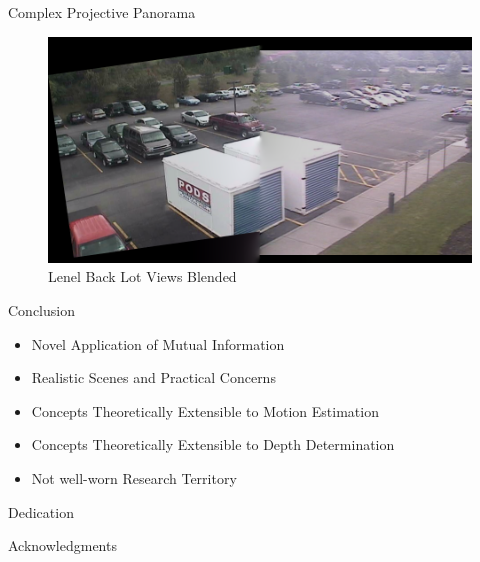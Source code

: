 \documentclass{beamer}
\begin{document}
\begin{frame}[c]{\sc Complex Projective Panorama}

\begin{figure}[!h]
\centering
\includegraphics[width=1\columnwidth]{Lenel010SP001}
\caption{Lenel Back Lot Views Blended}
\label{Lenel10Stitched}
\end{figure}

\end{frame}



\begin{frame}[c]{\sc Conclusion}
\begin{itemize}
\item Novel Application of Mutual Information
\item Realistic Scenes and Practical Concerns
\item Concepts Theoretically Extensible to Motion Estimation
\item Concepts Theoretically Extensible to Depth Determination
\item Not well-worn Research Territory
\end{itemize}
\end{frame}



\begin{frame}[c]{Dedication}
%
\centering
[REDACTED; 2023]

\end{frame}



\begin{frame}[c]{Acknowledgments}
%
\centering
[REDACTED; 2023]

\end{frame}
\end{document}
